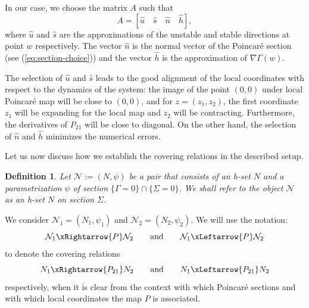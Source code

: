 \documentclass[1p]{article}
\newtheorem{definition}{Definition}
\begin{document}
In our case, we choose the matrix $A$ such that
\begin{equation}
    \label{eq:A-form}
    A = \left[ \hat{u} \quad \hat{s} \quad \hat{n} \quad \hat{h} \right],
\end{equation}
where $\hat{u}$ and $\hat{s}$ are the approximations of the unstable and stable directions at point $w$ respectively. The vector $\hat{n}$ is the normal vector of the Poincar\'e section (see (\ref{eq:section-choice})) and the vector $\hat{h}$ is the approximation of $\nabla \Gamma (w)$.

The selection of $\hat{u}$ and $\hat{s}$ leads to the good alignment of the local coordinates with respect to the dynamics of the system: the image of the point $(0,0)$ under local Poincar\'e map will be close to $(0,0)$, and for $z=(z_1, z_2)$, the first coordinate $z_1$ will be expanding for the local map and $z_2$ will be contracting. Furthermore, the derivatives of $P_{21}$ will be close to diagonal.  On the other hand, the selection of $\hat{n}$ and $\hat{h}$ minimizes the numerical errors.

Let us now discuss how we establish the covering relations in the described setup.

\begin{definition}
    \label{def:h_set_on_section}
    Let $\mathcal{N} := (N, \psi)$ be a pair that consists of an h-set $N$ and a parametrization $\psi$ of section $\{\Gamma = 0\} \cap \{ \Sigma = 0 \}$. We shall refer to the object $\mathcal{N}$ as an h-set $N$ on section $\Sigma$.
\end{definition}

We consider $\mathcal{N}_1 = (N_1, \psi_1)$ and $\mathcal{N}_2 = (N_2, \psi_2)$. We will use the notation:
\begin{equation}
    \label{eq:sec-covering-1}
    \mathcal{N}_1 \xRightarrow{P} \mathcal{N}_2 \qquad\text{and}\qquad
    \mathcal{N}_1 \xLeftarrow{P} \mathcal{N}_2
\end{equation}
to denote the covering relations
\begin{equation}
    \label{eq:sec-covering-2}
    N_1 \xRightarrow{P_{21}} N_2 \qquad\text{and}\qquad
    N_1 \xLeftarrow{P_{21}} N_2 
\end{equation} 
respectively, when it is clear from the context with which Poincar\'e sections and with which local coordinates the map $P$ is associated.
\end{document}
